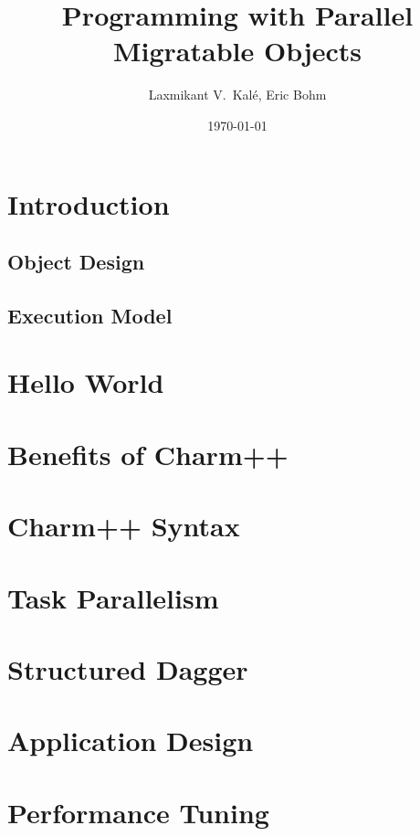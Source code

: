 \documentclass{beamer}
\title[Parallel Migratable Objects]{Programming with Parallel Migratable Objects}
\institute[UIUC]{Parallel Programming Laboratory \\University of Illinois Urbana-Champaign}
\author{Laxmikant V.~Kal\'e, Eric Bohm}
\date{\today}
\begin{document}
\frame{\titlepage}


\section[Concepts]{Introduction}

\subsection[Object Design]{Object Design}


\subsection[Execution Mode]{Execution Model}

\section[Hello World]{Hello World}

\section[Benefits]{Benefits of Charm++}

\section[Charm++]{Charm++ Syntax}

\section[Task Parallelism]{Task Parallelism}

\section[Charm++]{Structured Dagger}


\section[Application Design]{Application Design}

\section[Tuning]{Performance Tuning}

\end{document}
